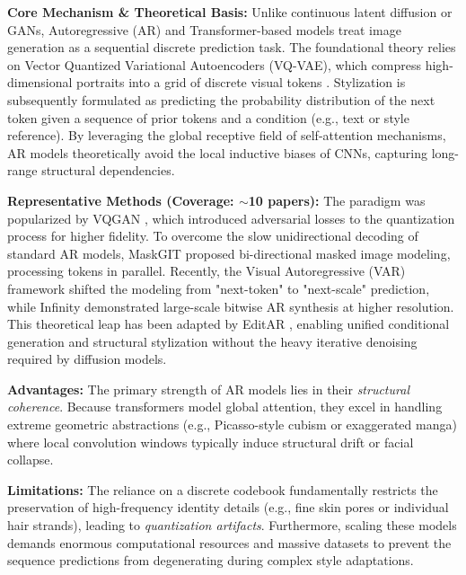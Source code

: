 \documentclass[journal]{IEEEtran}
\begin{document}
\textbf{Core Mechanism \& Theoretical Basis:} Unlike continuous latent diffusion or GANs, Autoregressive (AR) and Transformer-based models treat image generation as a sequential discrete prediction task. The foundational theory relies on Vector Quantized Variational Autoencoders (VQ-VAE), which compress high-dimensional portraits into a grid of discrete visual tokens \cite{esser2021vqgan}. Stylization is subsequently formulated as predicting the probability distribution of the next token given a sequence of prior tokens and a condition (e.g., text or style reference). By leveraging the global receptive field of self-attention mechanisms, AR models theoretically avoid the local inductive biases of CNNs, capturing long-range structural dependencies.

\textbf{Representative Methods (Coverage: $\sim$10 papers):} The paradigm was popularized by VQGAN \cite{esser2021vqgan}, which introduced adversarial losses to the quantization process for higher fidelity. To overcome the slow unidirectional decoding of standard AR models, MaskGIT \cite{chang2022maskgit} proposed bi-directional masked image modeling, processing tokens in parallel. Recently, the Visual Autoregressive (VAR) framework \cite{tian2024var} shifted the modeling from "next-token" to "next-scale" prediction, while Infinity \cite{han2024infinity} demonstrated large-scale bitwise AR synthesis at higher resolution. This theoretical leap has been adapted by EditAR \cite{mu2025editar}, enabling unified conditional generation and structural stylization without the heavy iterative denoising required by diffusion models.

\textbf{Advantages:} The primary strength of AR models lies in their \textit{structural coherence}. Because transformers model global attention, they excel in handling extreme geometric abstractions (e.g., Picasso-style cubism or exaggerated manga) where local convolution windows typically induce structural drift or facial collapse.

\textbf{Limitations:} The reliance on a discrete codebook fundamentally restricts the preservation of high-frequency identity details (e.g., fine skin pores or individual hair strands), leading to \textit{quantization artifacts}. Furthermore, scaling these models demands enormous computational resources and massive datasets to prevent the sequence predictions from degenerating during complex style adaptations.
\end{document}
